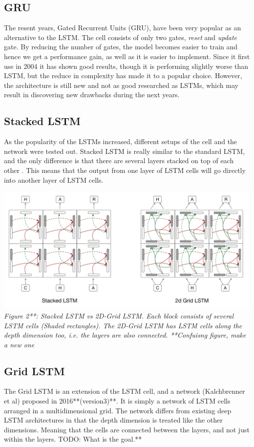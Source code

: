 \documentclass{article} %
\begin{document}
\subsection{GRU}
The resent years, Gated Recurrent Units (GRU), have been very popular as an alternative to the LSTM. The cell consists of only two gates, \textit{reset} and \textit{update} gate. By reducing the number of gates, the model becomes easier to train and hence we get a performance gain, as well as it is easier to implement. Since it first use in 2004 \cite{Cho} it has shown good results, though it is performing slightly worse than LSTM, but the reduce in complexity has made it to a popular choice. However, the architecture is still new and not as good researched as LSTMs, which may result in discovering new drawbacks during the next years.

\subsection{Stacked LSTM}
As the popularity of the LSTMs increased, different setups of the cell and the network were tested out. Stacked LSTM is really similar to the standard LSTM, and the only difference is that there are several layers stacked on top of each other \cite{gridLSTM}. This means that the output from one layer of LSTM cells will go directly into another layer of LSTM cells.

\includegraphics[scale=0.4]{stacked_vs_2dgrid} \newline
\textit{Figure 2**: Stacked LSTM vs 2D-Grid LSTM. Each block consists of several LSTM cells (Shaded rectangles). The 2D-Grid LSTM has LSTM cells along the depth dimension too, i.e. the layers are also connected. **Confuisng figure, make a new one}

\subsection{Grid LSTM}
The Grid LSTM is an extension of the LSTM cell, and a network (Kalchbrenner et al) \cite{Kalchbrenner} proposed in 2016**(version3)**. It is simply a network of LSTM cells arranged in a multidimensional grid. The network differs from existing deep LSTM architectures in that the depth dimension is treated like the other dimensions. Meaning that the cells are connected between the layers, and not just within the layers. TODO: What is the goal.**
\end{document}
